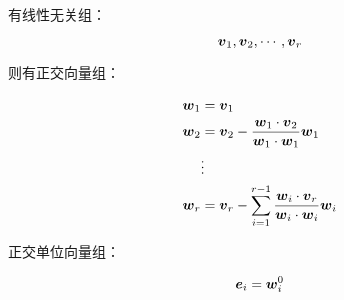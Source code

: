 \documentclass{article}
\begin{document}
有线性无关组：

\[\boldsymbol v_1,\boldsymbol v_2,\cdots,\boldsymbol v_r\]

则有正交向量组：

\[\begin{aligned}
        \boldsymbol w_1  & =\boldsymbol v_1                                                         \\
        \boldsymbol w_2  & =\boldsymbol v_2-\frac{\boldsymbol w_1\cdot\boldsymbol v_2}{\boldsymbol w_1\cdot\boldsymbol w_1}\boldsymbol w_1                 \\
              & \vdots                                                        \\
        \boldsymbol w_r  & =\boldsymbol v_r-\sum_{i=1}^{r-1}\frac{\boldsymbol w_i\cdot\boldsymbol v_r}{\boldsymbol w_i\cdot\boldsymbol w_i}\boldsymbol w_i
    \end{aligned}\]

正交单位向量组：

\[\boldsymbol e_i=\boldsymbol w_i^0\]
\end{document}
